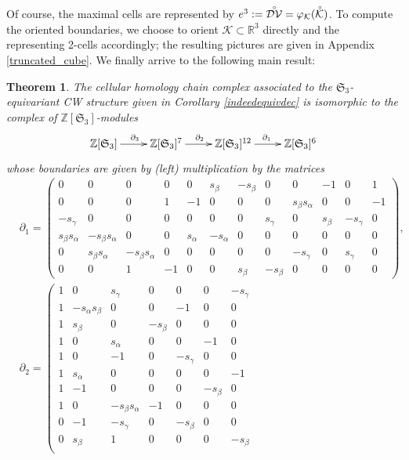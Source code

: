 \documentclass[11pt,twoside]{amsart}
\theoremstyle{plain}
\newtheorem{theo}[prop]{Theorem}
\newcommand{\R}{{\mathbb R}}
\newcommand{\Z}{{\mathbb Z}}
\newcommand{\Sym}{\mathfrak{S}}
\newcommand{\interior}[1]{\accentset{\circ}{#1}}
\begin{document}
Of course, the maximal cells are represented by $e^3:=\interior{\mathcal{DV}}=\varphi_{\mathcal{K}}(\interior{\mathcal{K}})$.
To compute the oriented boundaries, we choose to orient $\mathcal{K}\subset\R^3$ directly and the representing 2-cells accordingly; the resulting pictures are given in Appendix \ref{truncated_cube}. We finally arrive to the following main result:

\begin{theo}\label{last_decomposition}
The cellular homology chain complex associated to the $\Sym_3$-equivariant CW structure given in Corollary \ref{indeedequivdec} is isomorphic to the complex of $\Z[\Sym_3]$-modules
\[\xymatrix{\Z[\Sym_3] \ar^{\partial_3}[r] & \Z[\Sym_3]^7 \ar^{\partial_2}[r] & \Z[\Sym_3]^{12} \ar^{\partial_1}[r] & \Z[\Sym_3]^6}\]
whose boundaries are given by (left) multiplication by the matrices
\begin{align*}
&\partial_1=\left(\begin{smallmatrix}0 & 0 & 0 & 0 & 0 & s_\beta & -s_\beta & 0 & 0 & -1 & 0 & 1 \\ 0 & 0 & 0 & 1 & -1 & 0 & 0 & 0 & s_{\beta}s_\alpha & 0 & 0 & -1 \\ -s_\gamma & 0 & 0 & 0 & 0 & 0 & 0 & s_\gamma & 0 & s_\beta & -s_\gamma & 0 \\ s_\beta s_\alpha & -s_\beta s_\alpha & 0 & 0 & s_\alpha & -s_\alpha & 0 & 0 & 0 & 0 & 0 & 0 \\ 0 & s_\beta s_\alpha & -s_\beta s_\alpha & 0 & 0 & 0 & 0 & 0 & -s_\gamma & 0 & s_\gamma & 0 \\ 0 & 0 & 1 & -1 & 0 & 0 & s_\beta & -s_\beta & 0 & 0 & 0 & 0\end{smallmatrix}\right), \\
&\partial_2=\left(\begin{smallmatrix}
1 & 0 & s_\gamma & 0 & 0 & 0 & -s_\gamma \\
1 & -s_\alpha s_\beta & 0 & 0 & -1 & 0 & 0 \\
1 & s_\beta & 0 & -s_\beta & 0 & 0 & 0 \\
1 & 0 & s_\alpha & 0 & 0 & -1 & 0 \\
1 & 0 & -1 & 0 & -s_\gamma & 0 & 0 \\
1 & s_\alpha & 0 & 0 & 0 & 0 & -1 \\
1 & -1 & 0 & 0 & 0 & -s_\beta & 0 \\
1 & 0 & -s_\beta s_\alpha & -1 & 0 & 0 & 0 \\
0 & -1 & -s_\gamma & 0 & -s_\beta & 0 & 0 \\
0 & s_\beta & 1 & 0 & 0 & 0 & -s_\beta \\

\end{smallmatrix}
\end{align*}
\end{theo}
\end{document}
